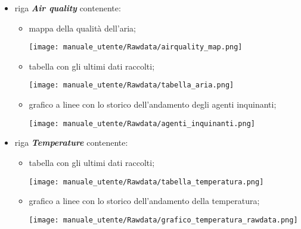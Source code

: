 \begin{itemize}
\begin{itemize}
\begin{center}
        \end{center} 
    \end{itemize}
    \newpage
    \item riga \textit{\textbf{Air quality}} contenente:
    \begin{itemize}
        \item mappa della qualità dell'aria;
        \begin{center}
            \texttt{[image: manuale\_utente/Rawdata/airquality\_map.png]}
        \end{center}
        \item tabella con gli ultimi dati raccolti;
        \begin{center}
            \texttt{[image: manuale\_utente/Rawdata/tabella\_aria.png]}
        \end{center}
        \item grafico a linee con lo storico dell'andamento degli agenti inquinanti;
        \begin{center}
            \texttt{[image: manuale\_utente/Rawdata/agenti\_inquinanti.png]}
        \end{center}
    \end{itemize}
    \item riga \textit{\textbf{Temperature}} contenente:
    \begin{itemize}
        \item tabella con gli ultimi dati raccolti;
        \begin{center}
            \texttt{[image: manuale\_utente/Rawdata/tabella\_temperatura.png]}
        \end{center}
        \item grafico a linee con lo storico dell'andamento della temperatura;
        \begin{center}
            \texttt{[image: manuale\_utente/Rawdata/grafico\_temperatura\_rawdata.png]}
        \end{center}
    \end{itemize}

\end{itemize}
